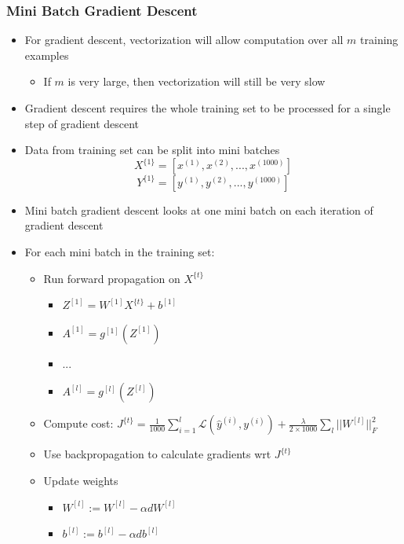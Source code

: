 \documentclass[12pt, letterpaper]{article}
\begin{document}
    \subsubsection{Mini Batch Gradient Descent}
    \begin{itemize}
        \item For gradient descent, vectorization will allow computation over all $m$ training examples
        \begin{itemize}
            \item If $m$ is very large, then vectorization will still be very slow
        \end{itemize}
        \item Gradient descent requires the whole training set to be processed for a single step of gradient descent
        \item Data from training set can be split into mini batches
        $$X^{\{1\}}=[x^{(1)},x^{(2)},...,x^{(1000)}]$$
        $$Y^{\{1\}}=[y^{(1)},y^{(2)},...,y^{(1000)}]$$
        \item Mini batch gradient descent looks at one mini batch on each iteration of gradient descent
        \item For each mini batch in the training set:
        \begin{itemize}
            \item Run forward propagation on $X^{\{t\}}$
            \begin{itemize}
                \item[] $Z^{[1]}=W^{[1]}X^{\{t\}}+b^{[1]}$
                \item[] $A^{[1]}=g^{[1]}(Z^{[1]})$
                \item[] ...
                \item[] $A^{[l]}=g^{[l]}(Z^{[l]})$
            \end{itemize}
            \item Compute cost: $J^{\{t\}}=\frac{1}{1000}\sum_{i=1}^l\mathcal{L}(\hat{y}^{(i)},y^{(i)})+\frac{\lambda}{2\times 1000}\sum_l||W^{[l]}||_F^2$
            \item Use backpropagation to calculate gradients wrt $J^{\{t\}}$
            \item Update weights
            \begin{itemize}
                \item[] $W^{[l]}:=W^{[l]}-\alpha dW^{[l]}$
                \item[] $b^{[l]}:=b^{[l]}-\alpha db^{[l]}$
            \end{itemize}

\end{itemize}
\end{itemize}
\end{document}
